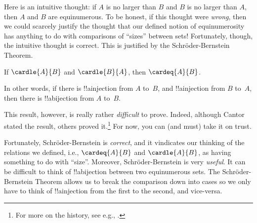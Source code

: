 \documentclass[../../../include/open-logic-section]{subfiles}
\begin{document}

\begin{explain}
Here is an intuitive thought: if $A$ is no larger than $B$ and $B$ is
no larger than $A$, then $A$ and $B$ are equinumerous. To be honest,
if this thought were \emph{wrong}, then we could scarcely justify the
thought that our defined notion of equinumerosity has anything to do
with comparisons of ``sizes'' between sets!{} Fortunately, though,
the intuitive thought is correct. This is justified by the
Schr\"oder-Bernstein Theorem.
\end{explain}

\begin{thm}
	If $\cardle{A}{B}$ and $\cardle{B}{A}$,
	then $\cardeq{A}{B}$.
\end{thm}

\begin{explain}
In other words, if there is !!a{injection} from $A$ to~$B$, and
!!a{injection} from $B$ to~$A$, then there is !!a{bijection} from $A$
to~$B$. 

This result, however, is really rather \emph{difficult} to prove.
Indeed, although Cantor stated the result, others proved
it.\footnote{For more on the history, see e.g.,
\cite[pp.~165--6]{Potter2004}.}
% 
For now, you can (and must)
take it on trust. 

Fortunately, Schr\"oder-Bernstein is \emph{correct}, and it
vindicates our thinking of the relations we defined, i.e.,
$\cardeq{A}{B}$ and $\cardle{A}{B}$, as having something to do with
``size''. Moreover, Schr\"oder-Bernstein is very \emph{useful}. It
can be difficult to think of !!a{bijection} between two equinumerous
sets. The Schr\"oder-Bernstein Theorem allows us to break the comparison
down into cases so we only have to think of !!a{injection} from the
first to the second, and vice-versa.
\end{explain}
\end{document}
